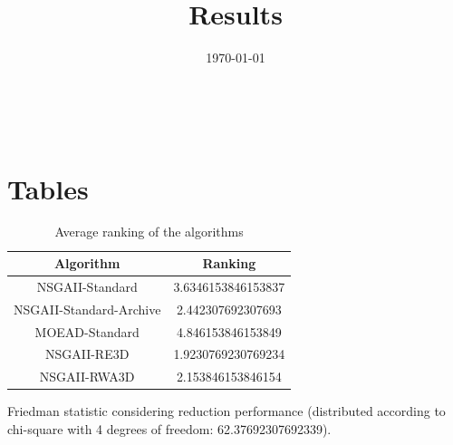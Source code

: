 \documentclass{article}
\title{Results}
\author{}
\date{\today}
\begin{document}
\oddsidemargin 0in \topmargin 0in\maketitle
\
\section{Tables}
\begin{table}[!htp]
\centering
\caption{Average ranking of the algorithms}
\begin{tabular}{c|c}
Algorithm&Ranking\\
\hline
NSGAII-Standard&3.6346153846153837\\
NSGAII-Standard-Archive&2.442307692307693\\
MOEAD-Standard&4.846153846153849\\
NSGAII-RE3D&1.9230769230769234\\
NSGAII-RWA3D&2.153846153846154\\
\end{tabular}
\end{table}


Friedman statistic considering reduction performance (distributed according to chi-square with 4 degrees of freedom: 62.37692307692339).
\end{document}
